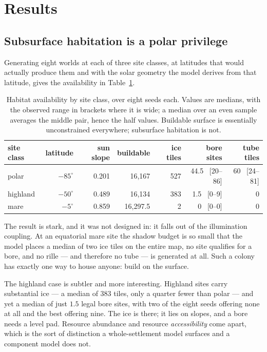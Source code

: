 \section{Results}
\label{sec:results}

\subsection{Subsurface habitation is a polar privilege}

Generating eight worlds at each of three site classes, at latitudes that would
actually produce them and with the solar geometry the model derives from that
latitude, gives the availability in Table~\ref{tab:sites}.

\begin{table}[htbp]
\centering
\caption{Habitat availability by site class, over eight seeds each. Values are
medians, with the observed range in brackets where it is wide; a median over an
even sample averages the middle pair, hence the half values. Buildable surface
is essentially unconstrained everywhere; subsurface habitation is not.}
\label{tab:sites}
\begin{tabular}{lrrrrrr}
\toprule
site class & latitude & sun slope & buildable & ice tiles & bore sites & tube tiles \\
\midrule
polar    & $-85^\circ$ & 0.201 & 16{,}167 & 527 & 44.5 \, [20--86] & 60 \, [24--81] \\
highland & $-50^\circ$ & 0.489 & 16{,}134 & 383 &  1.5 \, [0--9]   &  0 \\
mare     & $-5^\circ$  & 0.859 & 16{,}297.5 &   2 &  0 \, [0--0]     &  0 \\
\bottomrule
\end{tabular}
\end{table}

The result is stark, and it was not designed in: it falls out of the
illumination coupling. At an equatorial mare site the shadow budget is so small
that the model places a median of two ice tiles on the entire map, no site
qualifies for a bore, and no rille --- and therefore no tube --- is generated at
all. Such a colony has exactly one way to house anyone: build on the surface.

The highland case is subtler and more interesting. Highland sites carry
substantial ice --- a median of 383 tiles, only a quarter fewer than polar ---
and yet a median of just $1.5$ legal bore sites, with two of the eight seeds
offering none at all and the best offering nine. The ice is there; it lies on
slopes, and a bore needs a level pad. Resource abundance and resource
\emph{accessibility} come apart, which is the sort of distinction a
whole-settlement model surfaces and a component model does not.

